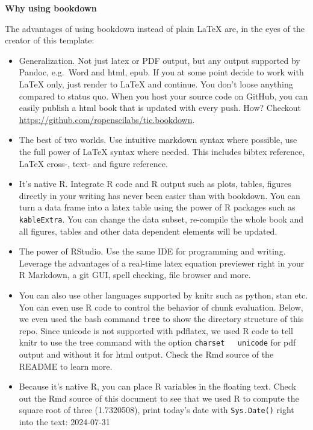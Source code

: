 \documentclass[11pt,a4paper,twoside,openright]{report}
\theoremstyle{definition}
\numberwithin{equation}{subsection}
\providecommand{\tightlist}{%
  \setlength{\itemsep}{0pt}\setlength{\parskip}{0pt}}
\begin{document}
\textbf{Why using bookdown}

The advantages of using bookdown instead of plain LaTeX are, in the eyes of the
creator of this template:

\begin{itemize}
\tightlist
\item
  Generalization. Not just latex or PDF output, but any output supported by
  Pandoc, e.g.~Word and html, epub. If you at some point decide to work with
  LaTeX only, just render to LaTeX and continue. You don't loose anything
  compared to status quo. When you host your source code on GitHub, you can
  easily publish a html book that is updated with every push. How? Checkout
  \url{https://github.com/ropenscilabs/tic.bookdown}.
\item
  The best of two worlds. Use intuitive markdown syntax where possible, use the
  full power of LaTeX syntax where needed. This includes bibtex reference, LaTeX
  cross-, text- and figure reference.
\item
  It's native R. Integrate R code and R output such as plots, tables, figures
  directly in your writing has never been easier than with bookdown. You can turn
  a data frame into a latex table using the power of R packages such as
  \texttt{kableExtra}. You can change the data subset, re-compile the whole book and
  all figures, tables and other data dependent elements will be updated.
\item
  The power of RStudio. Use the same IDE for programming and writing. Leverage
  the advantages of a real-time latex equation previewer right in your R
  Markdown, a git GUI, spell checking, file browser and more.
\item
  You can also use other languages supported by knitr such as
  python, stan etc. You can even use R code to control the behavior of chunk
  evaluation. Below, we even used the bash command \texttt{tree} to show the
  directory structure of this repo. Since unicode is not supported with pdflatex,
  we used R code to tell knitr to use the tree command with the option \texttt{charset\ \ \ unicode} for pdf output and without it for html output. Check the Rmd source
  of the README to learn more.
\item
  Because it's native R, you can place R variables in the floating text. Check
  out the Rmd source of this document to see that we used R to compute the square
  root of three (1.7320508), print today's date with \texttt{Sys.Date()} right into the
  text: 2024-07-31
\end{itemize}
\end{document}
